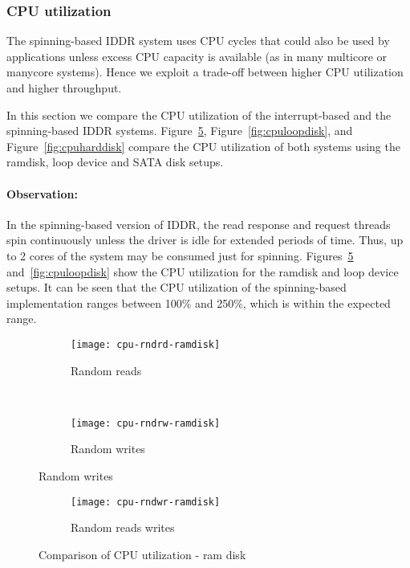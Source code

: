 \subsubsection*{CPU utilization}

The spinning-based IDDR system uses CPU cycles that could also be
used by applications unless excess CPU capacity is available (as in many
multicore or manycore systems). Hence we exploit a trade-off between higher 
CPU utilization and higher throughput.

In this section we compare the CPU utilization of the interrupt-based and
the spinning-based IDDR systems. Figure~\ref{fig:cpuramdisk}, Figure~\ref{fig:cpuloopdisk}, and
Figure~\ref{fig:cpuharddisk} compare the CPU utilization of both 
systems using the ramdisk, loop device and SATA disk setups.

\paragraph{Observation: }
In the spinning-based version of IDDR, the read response and request threads
spin continuously unless the driver is idle for extended periods of time.
Thus, up to 2 cores of the system may be consumed just for spinning.
Figures~\ref{fig:cpuramdisk} and~\ref{fig:cpuloopdisk} show the CPU
utilization for the ramdisk and loop device setups.
It can be seen that the CPU utilization of the spinning-based 
implementation ranges between 100\% and 250\%, which is within the
expected range.

\begin{figure}[!ht]
\centering
  \begin{subfigure}[b]{\textwidth}
  \texttt{[image: cpu-rndrd-ramdisk]}
  \caption{Random reads}
  \label{subfig:cpu-rndrd-ramdisk}
  \end{subfigure}\\
  \begin{subfigure}[b]{\textwidth}
  \texttt{[image: cpu-rndrw-ramdisk]}
  \caption{Random writes}
  \label{subfig:cpu-rndrw-ramdisk}
  \end{subfigure}
\end{figure}

\begin{figure}[H]
  \ContinuedFloat
  \begin{subfigure}[b]{\textwidth}
  \texttt{[image: cpu-rndwr-ramdisk]}
  \caption{Random reads writes}
  \label{subfig:cpu-rndwr-ramdisk}
  \end{subfigure}
\caption{Comparison of CPU utilization - ram disk}\label{fig:cpuramdisk}
\end{figure}

